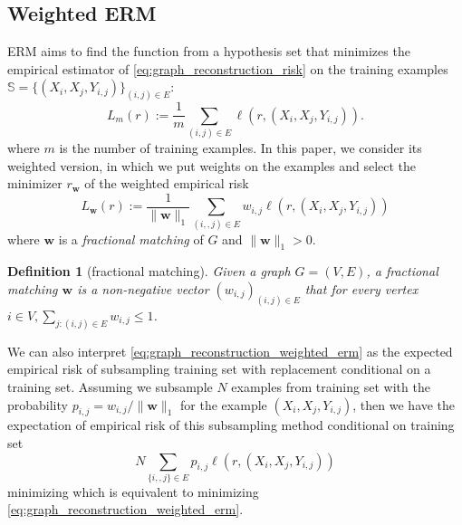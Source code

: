 \documentclass[letterpaper]{article} %
\def\LongVersion{}
\def\LongVersionEnd{}
\newtheorem{definition}{Definition}
\newcommand{\weight}{\mathbf{w}}
\newcommand{\empiricalrisk}[1]{L_{#1}}
\newcommand{\lossf}{\ell}
\newcommand{\pair}[1]{(#1)}
\newcommand{\normo}[1]{\|#1\|_1}
\newcommand{\trainingset}{\mathbb{S}}
\begin{document}
\subsection{Weighted ERM} %

\label{sub:weighted_empirical_risk_minimization}

ERM aims to find the function from a hypothesis set that minimizes the empirical estimator of \eqref{eq:graph_reconstruction_risk} on the training examples $\trainingset{}=\{(X_i,X_j,Y_{i,j})\}_{\pair{i,j}\in E}$:
\begin{equation}
    \label{eq:graph_reconstruction_non_weighted_erm}
    \empiricalrisk{m}(r) := \frac{1}{m}\sum_{\pair{i,j}\in E} \lossf(r, (X_i,X_j, Y_{i,j})).
\end{equation}
where $m$ is the number of training examples. 
In this paper, we consider its weighted version, in which we put weights on the examples and select the minimizer $r_\weight{}$ of the weighted empirical risk
\begin{equation}
    \label{eq:graph_reconstruction_weighted_erm}
    \empiricalrisk{\weight}(r) := \frac{1}{\normo{\weight}} \sum_{\pair{i,,j}\in E} w_{i,j} \lossf(r, (X_i,X_j, Y_{i,j}))
\end{equation}
where $\weight$ is a \emph{fractional matching} of $G$ and $\normo{\weight{}} > 0$. 
\begin{definition}[fractional matching]
Given a graph $G=(V,E)$, a \emph{fractional matching} $\weight$ is a non-negative 
vector $(w_{i,j})_{\pair{i,j}\in E}$ that for every vertex $i\in V, \sum_{j:\pair{i,j}\in E}w_{i,j}\le 1$.
\end{definition}

\LongVersion
We can also interpret \eqref{eq:graph_reconstruction_weighted_erm} as the expected empirical risk of subsampling training set with replacement conditional on a training set.
Assuming we subsample $N$ examples from training set with the probability $p_{i,j}=w_{i,j}/\normo{\weight{}}$ for the example $(X_i,X_j,Y_{i,j})$, then we have the expectation of empirical risk of this subsampling method conditional on training set
\begin{equation}
    \label{eq:subsampling_erm}
    N\sum_{\{i,,j\}\in E} p_{i,j} \lossf(r, (X_i,X_j, Y_{i,j}))
\end{equation}
minimizing which is equivalent to minimizing \eqref{eq:graph_reconstruction_weighted_erm}.
\LongVersionEnd
\end{document}
